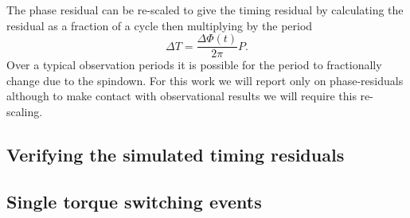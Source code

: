 \documentclass[/home/greg/Thesis/main/main.tex]{subfiles}
\begin{document}
The phase residual can be re-scaled to
give the timing residual by calculating the residual as a fraction of a cycle
then multiplying by the period
\begin{equation}
    \Delta T = \frac{\Delta\Phi(t)}{2\pi} P.
    \label{eqn: phase to timing}
\end{equation}
Over a typical observation periods it is possible for the period to
fractionally change due to the spindown. For this work we will report only on
phase-residuals although to make contact with observational results we will
require this re-scaling.

\subsection{Verifying the simulated timing residuals}


\FloatBarrier
\subsection{Single torque switching events}


\biblio
\end{document}
